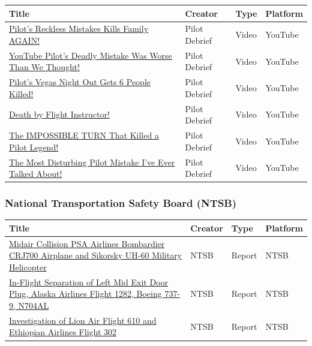 \documentclass[12pt]{article}
\begin{document}
            \setlength{\tabcolsep}{4pt}
            \begin{tabular}{p{} p{} p{} p{}}
            \hline
            \textbf{Title} & \textbf{Creator} & \textbf{Type} & \textbf{Platform} \\
            \hline
            \href{https://www.youtube.com/watch?v=x4v2z9G0gEU}{Pilot's Reckless Mistakes Kills Family AGAIN!} & Pilot Debrief & Video & YouTube \\[4pt]
            \href{https://www.youtube.com/watch?v=C2ciF6DC2G4}{YouTube Pilot's Deadly Mistake Was Worse Than We Thought!} & Pilot Debrief & Video & YouTube \\[4pt]
            \href{https://www.youtube.com/watch?v=ZN233YmvBdc}{Pilot's Vegas Night Out Gets 6 People Killed!} & Pilot Debrief & Video & YouTube \\[4pt]
            \href{https://www.youtube.com/watch?v=towgUsu2dIs}{Death by Flight Instructor!} & Pilot Debrief & Video & YouTube \\[4pt]
            \href{https://www.youtube.com/watch?v=_pQGkuMlj_A}{The IMPOSSIBLE TURN That Killed a Pilot Legend!} & Pilot Debrief & Video & YouTube \\[4pt]
            \href{https://www.youtube.com/watch?v=Uids6OOXQQM}{The Most Disturbing Pilot Mistake I've Ever Talked About!} & Pilot Debrief & Video & YouTube \\[4pt]
            \hline
            \end{tabular}

            \subsubsection{National Transportation Safety Board (NTSB)}

            \setlength{\tabcolsep}{4pt}
            \begin{tabular}{p{} p{} p{} p{}}
            \hline
            \textbf{Title} & \textbf{Creator} & \textbf{Type} & \textbf{Platform} \\
            \hline
            \href{https://www.ntsb.gov/investigations/Pages/DCA25MA108.aspx}{Midair Collision PSA Airlines Bombardier CRJ700 Airplane and Sikorsky UH-60 Military Helicopter} & NTSB & Report & NTSB \\[4pt]
            \href{https://www.ntsb.gov/investigations/Pages/DCA24MA063.aspx}{In-Flight Separation of Left Mid Exit Door Plug, Alaska Airlines Flight 1282, Boeing 737-9, N704AL} & NTSB & Report & NTSB \\[4pt]
            \href{https://www.ntsb.gov/investigations/Pages/DCA19RA017-DCA19RA101.aspx}{Investigation of Lion Air Flight 610 and Ethiopian Airlines Flight 302} & NTSB & Report & NTSB \\[4pt]
            \hline
            \end{tabular}
\end{document}
